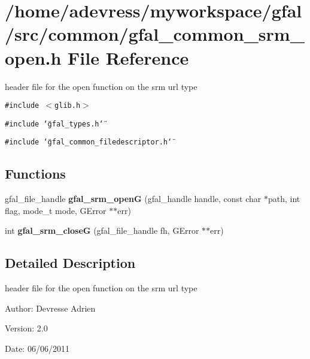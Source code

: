 \section{/home/adevress/myworkspace/gfal/src/common/gfal\_\-common\_\-srm\_\-open.h File Reference}
\label{gfal__common__srm__open_8h}
header file for the open function on the srm url type 

{\tt \#include $<$glib.h$>$}\par
{\tt \#include \char`\"{}gfal\_\-types.h\char`\"{}}\par
{\tt \#include \char`\"{}gfal\_\-common\_\-filedescriptor.h\char`\"{}}\par
\subsection*{Functions}
\begin{CompactItemize}
\item 
gfal\_\-file\_\-handle \textbf{gfal\_\-srm\_\-open\-G} (gfal\_\-handle handle, const char $\ast$path, int flag, mode\_\-t mode, GError $\ast$$\ast$err)\label{gfal__common__srm__open_8h_bb27bc48091a2a9a4ca124a35d3847a5}

\item 
int \textbf{gfal\_\-srm\_\-close\-G} (gfal\_\-file\_\-handle fh, GError $\ast$$\ast$err)\label{gfal__common__srm__open_8h_1b78856858fbfc8244d098fef0231d7d}

\end{CompactItemize}


\subsection{Detailed Description}
header file for the open function on the srm url type 

\begin{Desc}
\item[Author:]Devresse Adrien \end{Desc}
\begin{Desc}
\item[Version:]2.0 \end{Desc}
\begin{Desc}
\item[Date:]06/06/2011 \end{Desc}
